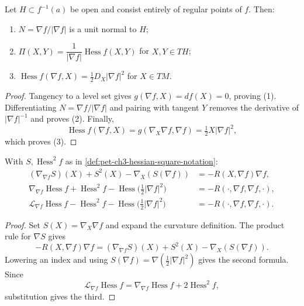 \begin{proposition}
  \label{prop:pet-ch3-normal-hessian-relation}
  \leanok
  Let $H\subset f^{-1}(a)$ be open and consist entirely of regular points of $f$.
  Then:
  \begin{enumerate}
    \item[(1)] $N=\nabla f/|\nabla f|$ is a unit normal to $H$;
    \item[(2)] $\Pi(X,Y)=\dfrac1{|\nabla f|}\operatorname{Hess}f(X,Y)$ for
    $X,Y\in TH$;
    \item[(3)] $\operatorname{Hess}f(\nabla f,X)=\tfrac12D_X|\nabla f|^2$ for
    $X\in TM$.
  \end{enumerate}
\end{proposition}
\begin{proof}
  \leanok
  \sketch
  Tangency to a level set gives $g(\nabla f,X)=df(X)=0$, proving (1).
  Differentiating $N=\nabla f/|\nabla f|$ and pairing with tangent $Y$ removes the
  derivative of $|\nabla f|^{-1}$ and proves (2). Finally,
  \[
   \operatorname{Hess}f(\nabla f,X)
   =g(\nabla_X\nabla f,\nabla f)
   =\tfrac12X|\nabla f|^2,
  \]
  which proves (3).
\end{proof}

\begin{theorem}
  \label{thm:pet-ch3-radial-curvature-equation}
  \leanok
  With $S,\operatorname{Hess}^2f$ as in \cref{def:pet-ch3-hessian-square-notation}:
  \begin{align}
    (\nabla_{\nabla f}S)(X)+S^2(X)-\nabla_X(S(\nabla f))&=-R(X,\nabla f)\nabla f,\\
    \nabla_{\nabla f}\operatorname{Hess}f+\operatorname{Hess}^2f-\operatorname{Hess}\Big(\tfrac12|\nabla
    f|^2\Big)&=-R(\cdot,\nabla f,\nabla f,\cdot),\\
    \mathcal L_{\nabla f}\operatorname{Hess}f-\operatorname{Hess}^2f-\operatorname{Hess}\Big(\tfrac12|\nabla
    f|^2\Big)&=-R(\cdot,\nabla f,\nabla f,\cdot).
  \end{align}
\end{theorem}
\begin{proof}
  \leanok
  \sketch
  Set $S(X)=\nabla_X\nabla f$ and expand the curvature definition. The product
  rule for $\nabla S$ gives
  \[
   -R(X,\nabla f)\nabla f
   =(\nabla_{\nabla f}S)(X)+S^2(X)-\nabla_X(S(\nabla f)).
  \]
  Lowering an index and using
  $S(\nabla f)=\nabla(\tfrac12|\nabla f|^2)$ gives the second formula. Since
  \[
   \mathcal L_{\nabla f}\operatorname{Hess}f
   =\nabla_{\nabla f}\operatorname{Hess}f+2\operatorname{Hess}^2f,
  \]
  substitution gives the third.
\end{proof}

